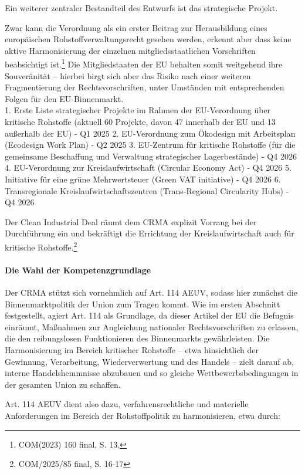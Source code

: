 \documentclass[12pt,a4paper,oneside]{book} %
\begin{document}
Ein weiterer zentraler Bestandteil des Entwurfs ist das \glqq strategische Projekt\grqq. %

Zwar kann die Verordnung als ein erster Beitrag zur Herausbildung eines europäischen Rohstoffverwaltungsrecht gesehen werden, erkennt aber dass keine aktive Harmonisierung der einzelnen mitgliedsstaatlichen Vorschriften beabsichtigt ist.\footnote{COM(2023) 160 final, S. 13.} Die Mitgliedstaaten der EU behalten somit weitgehend ihre Souveränität -- hierbei birgt sich aber das Risiko nach einer weiteren Fragmentierung der Rechtsvorschriften, unter Umständen mit entsprechenden Folgen für den EU-Binnenmarkt.
\\
1. Erste Liste strategischer Projekte im Rahmen der EU-Verordnung über kritische Rohstoffe (aktuell 60 Projekte, davon 47 innerhalb der EU und 13 außerhalb der EU) - Q1 2025 
2. EU-Verordnung zum Ökodesign mit Arbeitsplan (Ecodesign Work Plan) - Q2 2025
3. EU-Zentrum für kritische Rohstoffe (für die gemeinsame Beschaffung und 
Verwaltung strategischer Lagerbestände) - Q4 2026
4. EU-Verordnung zur Kreislaufwirtschaft (Circular Economy Act) - Q4 2026
5. Initiative für eine grüne Mehrwertsteuer (Green VAT initiative) - Q4 2026
6. Transregionale Kreislaufwirtschaftszentren (Trans-Regional Circularity Hubs) - Q4 2026


Der Clean Industrial Deal räumt dem CRMA explizit Vorrang bei der Durchführung ein und bekräftigt die Errichtung der Kreislaufwirtschaft auch für kritische Rohstoffe.\footnote{COM/2025/85 final, S. 16-17}


\paragraph{Die Wahl der Kompetenzgrundlage}
Der CRMA stützt sich vornehmlich auf Art. 114 AEUV, sodass hier zunächst die Binnenmarktpolitik der Union zum Tragen kommt. Wie im ersten Abschnitt festgestellt, agiert Art. 114 als Grundlage, da dieser Artikel der EU die Befugnis einräumt, Maßnahmen zur Angleichung nationaler Rechtsvorschriften zu erlassen, die den reibungslosen Funktionieren des Binnenmarkts gewährleisten. Die Harmonisierung im Bereich kritischer Rohstoffe – etwa hinsichtlich der Gewinnung, Verarbeitung, Wiederverwertung und des Handels – zielt darauf ab, interne Handelshemmnisse abzubauen und so gleiche Wettbewerbsbedingungen in der gesamten Union zu schaffen.

Art. 114 AEUV dient also dazu, verfahrensrechtliche und materielle Anforderungen im Bereich der Rohstoffpolitik zu harmonisieren, etwa durch:
\end{document}
